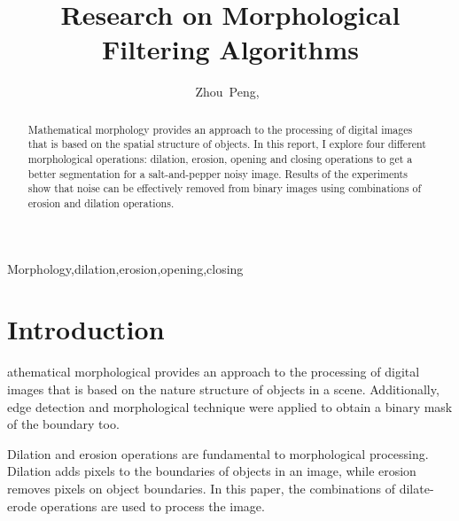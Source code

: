 \documentclass[journal,comsoc]{IEEEtran}
\begin{document}
\title{Research on Morphological Filtering Algorithms}
\author{Zhou~Peng,~}
\maketitle

\begin{abstract}
  Mathematical morphology provides an approach to the processing of digital images
  that is based on the spatial structure of objects.
  In this report, I explore four different morphological operations: dilation, erosion,
  opening and closing operations to get a better segmentation for a salt-and-pepper
  noisy\cite{noise} image. Results of the experiments show that noise can be effectively removed from
  binary images using combinations of erosion and dilation operations. 
\end{abstract}

\begin{IEEEkeywords}
Morphology,dilation,erosion,opening,closing
\end{IEEEkeywords}


\section{Introduction}

athematical morphological provides an approach to the processing of digital images
that is based on the nature structure of objects in a scene. 
Additionally, edge detection and morphological technique were applied to obtain a
binary mask of the boundary too.

Dilation and erosion operations are fundamental to morphological processing.
Dilation adds pixels to the boundaries of objects in an image, while erosion
removes pixels on object boundaries. In this paper, the combinations of dilate-erode
operations are used to process the image.
\end{document}
